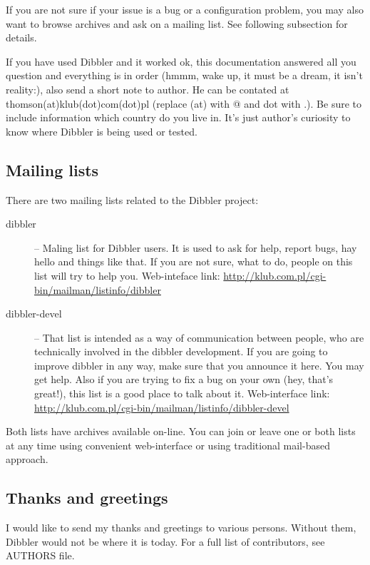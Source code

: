 If you are not sure if your issue is a bug or a configuration problem,
you may also want to browse archives and ask on a mailing list. See
following subsection for details.

If you have used Dibbler and it worked ok, this documentation answered
all you question and everything is in order (hmmm, wake up, it must be
a dream, it isn't reality:), also send a short note to author. He can
be contated at thomson(at)klub(dot)com(dot)pl (replace (at) with @ and
dot with .). Be sure to include information which country do you live
in. It's just author's curiosity to know where Dibbler is being used
or tested.

\subsection{Mailing lists}
There are two mailing lists related to the Dibbler project:
\begin{description}
\item[dibbler] -- Maling list for Dibbler users. It is used to ask for help,
report bugs, hay hello and things like that. If you are not sure, what to
do, people on this list will try to help you. Web-inteface link:
\href{http://klub.com.pl/cgi-bin/mailman/listinfo/dibbler}{http://klub.com.pl/cgi-bin/mailman/listinfo/dibbler}
\item[dibbler-devel] -- That list is intended as a way of communication
between people, who are technically involved in the dibbler development.
If you are going to improve dibbler in any way, make sure that you announce
it here. You may get help. Also if you are trying to fix a bug on your own
(hey, that's great!), this list is a good place to talk about it.
Web-interface link: \href{http://klub.com.pl/cgi-bin/mailman/listinfo/dibbler-devel}{http://klub.com.pl/cgi-bin/mailman/listinfo/dibbler-devel}
\end{description}

Both lists have archives available on-line. You can join or leave one or both lists
at any time using convenient web-interface or using traditional mail-based approach.

\subsection{Thanks and greetings}

I would like to send my thanks and greetings to various persons.
Without them, Dibbler would not be where it is today. For a full list
of contributors, see AUTHORS file.

